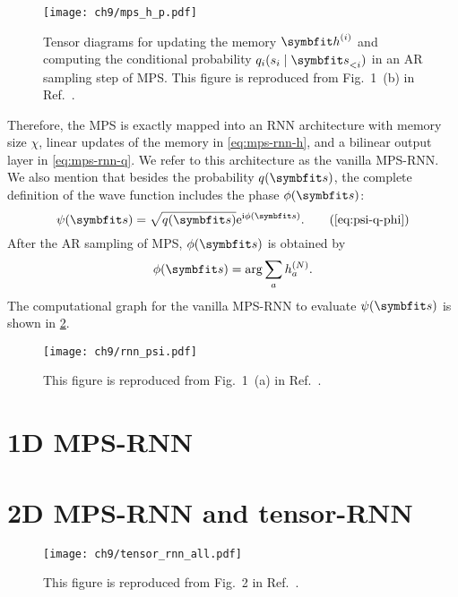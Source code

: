 \begin{figure}[htb]
\centering
\texttt{[image: ch9/mps\_h\_p.pdf]}
\caption[Tensor diagrams for an AR sampling step of MPS]{
Tensor diagrams for updating the memory $\vh^{(i)}$ and computing the conditional probability $q_i(s_i \mid \vs_{< i})$ in an AR sampling step of MPS.
This figure is reproduced from Fig.~1~(b) in Ref.~\cite{wu2023tensor}.
}
\label{fig:mps-h-p}
\end{figure}

Therefore, the MPS is exactly mapped into an RNN architecture with memory size $\chi$, linear updates of the memory in \cref{eq:mps-rnn-h}, and a bilinear output layer in \cref{eq:mps-rnn-q}. We refer to this architecture as the vanilla MPS-RNN. We also mention that besides the probability $q(\vs)$, the complete definition of the wave function includes the phase $\phi(\vs)$:
\begin{equation}
\psi(\vs) = \sqrt{q(\vs)} \rme^{\rmi \phi(\vs)}.
\tag{\ref{eq:psi-q-phi}}
\end{equation}
After the AR sampling of MPS, $\phi(\vs)$ is obtained by
\begin{equation}
\phi(\vs) = \arg \sum_{a} h^{(N)}_a.
\label{eq:mps-rnn-phase}
\end{equation}
The computational graph for the vanilla MPS-RNN to evaluate $\psi(\vs)$ is shown in \cref{fig:rnn-psi}.

\begin{figure}[htb]
\centering
\texttt{[image: ch9/rnn\_psi.pdf]}
\caption[Computational graph for vanilla MPS-RNN]{
This figure is reproduced from Fig.~1~(a) in Ref.~\cite{wu2023tensor}.
}
\label{fig:rnn-psi}
\end{figure}

\section{1D MPS-RNN}

\section{2D MPS-RNN and tensor-RNN}

\begin{figure}[htb]
\centering
\texttt{[image: ch9/tensor\_rnn\_all.pdf]}
\caption[Computational graph for tensor-RNN]{
This figure is reproduced from Fig.~2 in Ref.~\cite{wu2023tensor}.
}
\label{fig:tensor-rnn-all}
\end{figure}

